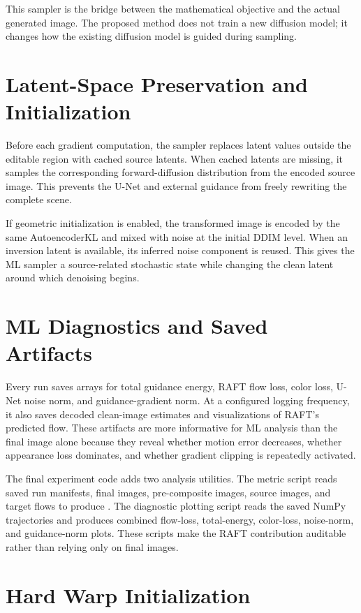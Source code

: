 This sampler is the bridge between the mathematical objective and the actual generated image. The proposed method does not train a new diffusion model; it changes how the existing diffusion model is guided during sampling.

\section{Latent-Space Preservation and Initialization}

Before each gradient computation, the sampler replaces latent values outside the editable region with cached source latents. When cached latents are missing, it samples the corresponding forward-diffusion distribution from the encoded source image. This prevents the U-Net and external guidance from freely rewriting the complete scene.

If geometric initialization is enabled, the transformed image is encoded by the same AutoencoderKL and mixed with noise at the initial DDIM level. When an inversion latent is available, its inferred noise component is reused. This gives the ML sampler a source-related stochastic state while changing the clean latent around which denoising begins.

\section{ML Diagnostics and Saved Artifacts}

Every run saves arrays for total guidance energy, RAFT flow loss, color loss, U-Net noise norm, and guidance-gradient norm. At a configured logging frequency, it also saves decoded clean-image estimates and visualizations of RAFT's predicted flow. These artifacts are more informative for ML analysis than the final image alone because they reveal whether motion error decreases, whether appearance loss dominates, and whether gradient clipping is repeatedly activated.

The final experiment code adds two analysis utilities. The metric script reads saved run manifests, final images, pre-composite images, source images, and target flows to produce . The diagnostic plotting script reads the saved NumPy trajectories and produces combined flow-loss, total-energy, color-loss, noise-norm, and guidance-norm plots. These scripts make the RAFT contribution auditable rather than relying only on final images.

\section{Hard Warp Initialization}

